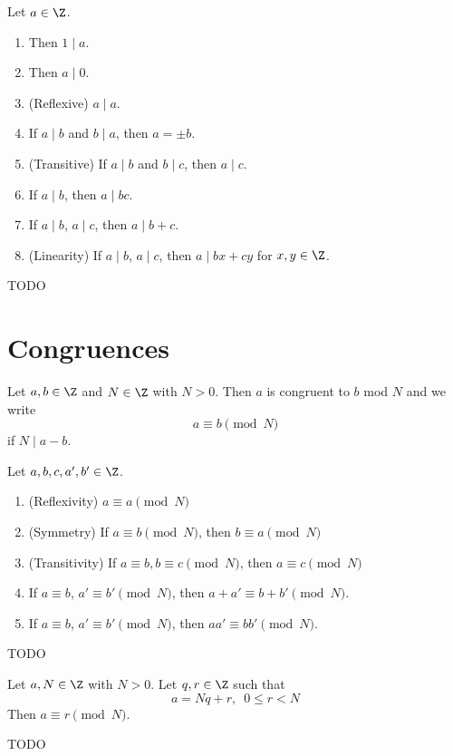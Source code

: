 \begin{prop}
  Let $a \in \Z$.
  \begin{enumerate}[nosep,label=\textnormal{(\alph*)}]
  \item Then $1 \mid a$.
  \item Then $a \mid 0$.
  \item (Reflexive) $a \mid a$.
  \item If $a \mid b$ and $b \mid a$, then $a = \pm b$.  
  \item (Transitive) If $a \mid b$ and $b \mid c$, then $a \mid c$.
  \item If $a \mid b$, then $a \mid bc$.
  \item If $a \mid b$, $a \mid c$, then $a \mid b + c$.
  \item (Linearity)
    If $a \mid b$, $a \mid c$, then $a \mid bx + cy$ for $x,y \in \Z$.  
  \end{enumerate}
\end{prop}
\proof
TODO

\newpage
\section{Congruences}

\begin{defn}
  Let $a, b \in \Z$ and $N \in \Z$ with $N > 0$.
  Then $a$ is congruent to $b$ mod $N$ and we write
  \[
  a \equiv b \pmod{N}
  \]
  if $N \mid a - b$.
\end{defn}


\begin{prop}
  Let $a,b,c,a',b' \in \Z$.
  \begin{enumerate}[nosep,label=\textnormal{(\alph*)}]
  \item (Reflexivity) $a \equiv a \pmod{N}$
  \item (Symmetry) If $a \equiv b \pmod{N}$, then $b \equiv a \pmod{N}$
  \item (Transitivity)
    If $a \equiv b, b \equiv c \pmod{N}$, then
    $a \equiv c \pmod{N}$
  \item
    If
    $a \equiv b$,
    $a' \equiv b' \pmod{N}$,
    then
    $a + a' \equiv b + b' \pmod{N}$.
  \item
    If
    $a \equiv b$,
    $a' \equiv b' \pmod{N}$,
    then
    $a a' \equiv b b' \pmod{N}$.
  \end{enumerate}
\end{prop}
\proof
TODO

\begin{prop}
  Let $a, N \in \Z$ with $N > 0$.
  Let $q, r \in \Z$ such that
  \[
  a = Nq + r, \,\,\, 0 \leq r < N
  \]
  Then $a \equiv r \pmod{N}$.
\end{prop}
\proof
TODO

